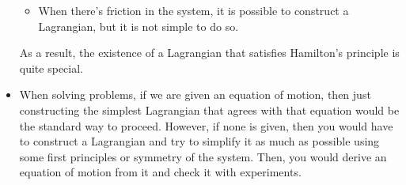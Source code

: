 \documentclass[10pt]{article}
\begin{document}
\begin{itemize}
\begin{itemize}
  		\item When there's friction in the system, it is possible to construct a Lagrangian, but it is not simple to do so.
  	\end{itemize}
  	As a result, the existence of a Lagrangian that satisfies Hamilton's principle is quite special.

  	\item When solving problems, if we are given an equation of motion, then just constructing the simplest Lagrangian that agrees with that equation would be the standard way to proceed. However, if none is given, then you would have to construct a Lagrangian and try to simplify it as much as possible using some first principles or symmetry of the system. Then, you would derive an equation of motion from it and check it with experiments.
  \end{itemize}

  


  
    
\end{document}
